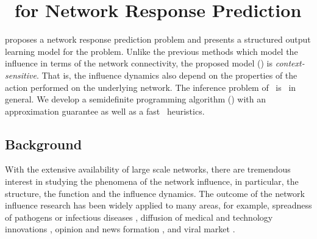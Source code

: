 {%
%
\section{\spin\ for Network Response Prediction} \label{sc_su14a}

 proposes a network response prediction problem and presents a structured output learning model for the problem.
Unlike the previous methods which model the influence in terms of the network connectivity, the proposed model (\spin) is \textit{context-sensitive}. 
That is, the influence dynamics also depend on the properties of the action performed on the underlying network.
The inference problem of \spin\ is \nphard\ in general.
We develop a semidefinite programming algorithm (\sdp) with an approximation guarantee as well as a fast \greedy\ heuristics.

\subsection{Background}

With the extensive availability of large scale networks, there are tremendous interest in studying the phenomena of the network influence, in particular, the structure, the function and the influence dynamics. 
The outcome of the network influence research has been widely applied to many areas, for example, spreadness of pathogens or infectious diseases \citep{Hethcote00the,Anderson02infectious}, diffusion of medical and technology innovations \citep{Strang98diffusion,Rogers03the}, opinion and news formation \citep{Adar04implicit,Gruhl04information,Adar05tracking,Leskovec07cascading,Nowell08tracing,Leskovec09meme}, and viral market \citep{Domingos01mining,Kempe03maximizing,Liben-Nowell03the}.

}
